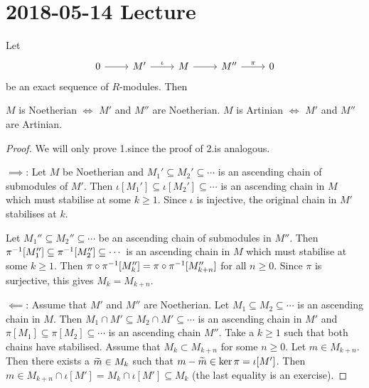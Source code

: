 \section{2018-05-14 Lecture}

\begin{prop}[3.3]
  Let
  \begin{equation*}
    \begin{tikzcd}
      0 \ar[r] & M' \ar[r,"\iota"] & M \ar[r] & M'' \ar[r,"\pi"] & 0
    \end{tikzcd}
  \end{equation*}
  be an exact sequence of $R$-modules.
  Then
  \begin{enum}
    \io $M$ is Noetherian $\iff$ $M'$ and $M''$ are Noetherian.
    \io $M$ is Artinian $\iff$ $M'$ and $M''$ are Artinian.
  \end{enum}
\end{prop}

\begin{proof}
  We will only prove 1.\@ since the proof of 2.\@ is analogous.

  $\implies$:
  Let $M$ be Noetherian and $M_1' \subseteq M_2' \subseteq \cdots$ is an ascending chain of submodules of $M'$.
  Then $\iota[M_1'] \subseteq \iota[M_2'] \subseteq \cdots$ is an ascending chain in $M$ which must stabilise at some $k \geq 1$.
  Since $\iota$ is injective, the original chain in $M'$ stabilises at $k$.

  Let $M_1'' \subseteq M_2'' \subseteq \cdots$ be an ascending chain of submodules in $M''$.
  Then $\pi^{-1}[M_1''] \subseteq \pi^{-1}[M_2''] \subseteq \cdots$ is an ascending chain in $M$ which must stabilise at some $k \geq 1$.
  Then $\pi\circ\pi^{-1}[M_k'']=\pi\circ\pi^{-1}[M_{k+n}'']$ for all $n \geq 0$.
  Since $\pi$ is surjective, this gives $M_k=M_{k+n}$.


  $\impliedby$:
  Assume that $M'$ and $M''$ are Noetherian.
  Let $M_1 \subseteq M_2 \subseteq \cdots$ is an ascending chain in $M$.
  Then $M_1 \cap M' \subseteq M_2 \cap M' \subseteq \cdots$ is an ascending chain in $M'$ and $\pi[M_1] \subseteq \pi[M_2] \subseteq \cdots$ is an ascending chain $M''$.
  Take a $k \geq 1$ such that both chains have stabilised.
  Assume that $M_k \subset M_{k+n}$ for some $n \geq 0$.
  Let $m \in M_{k+n}$.
  Then there exists a $\widetilde m \in M_k$ such that $m-\widetilde m \in \ker\pi = \iota[M']$.
  Then $m \in M_{k+n} \cap \iota[M'] = M_k \cap \iota[M'] \subseteq M_k$ (the last equality is an exercise).
\end{proof}

